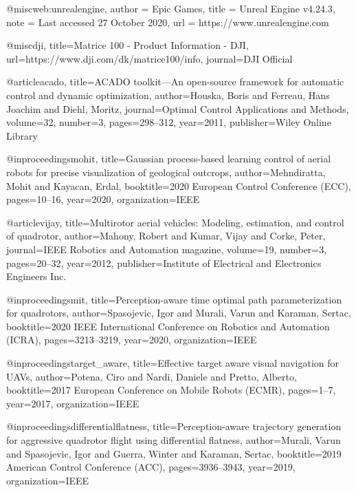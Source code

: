 \begin{thebibliography}{9}
@misc{web:unrealengine,
  author = {{Epic Games}},
  title = {{Unreal Engine v4.24.3}},
  note = {Last accessed 27 October 2020},
  url = {https://www.unrealengine.com}
}



@misc{dji, title={Matrice 100 - Product Information - DJI}, url={https://www.dji.com/dk/matrice100/info}, journal={DJI Official}} 


@article{acado,
  title={ACADO toolkit—An open-source framework for automatic control and dynamic optimization},
  author={Houska, Boris and Ferreau, Hans Joachim and Diehl, Moritz},
  journal={Optimal Control Applications and Methods},
  volume={32},
  number={3},
  pages={298--312},
  year={2011},
  publisher={Wiley Online Library}
}





@inproceedings{mohit,
  title={Gaussian process-based learning control of aerial robots for precise visualization of geological outcrops},
  author={Mehndiratta, Mohit and Kayacan, Erdal},
  booktitle={2020 European Control Conference (ECC)},
  pages={10--16},
  year={2020},
  organization={IEEE}
}




@article{vijay,
  title={Multirotor aerial vehicles: Modeling, estimation, and control of quadrotor},
  author={Mahony, Robert and Kumar, Vijay and Corke, Peter},
  journal={IEEE Robotics and Automation magazine},
  volume={19},
  number={3},
  pages={20--32},
  year={2012},
  publisher={Institute of Electrical and Electronics Engineers Inc.}
}


@inproceedings{mit,
  title={Perception-aware time optimal path parameterization for quadrotors},
  author={Spasojevic, Igor and Murali, Varun and Karaman, Sertac},
  booktitle={2020 IEEE International Conference on Robotics and Automation (ICRA)},
  pages={3213--3219},
  year={2020},
  organization={IEEE}
}

@inproceedings{target_aware,
  title={Effective target aware visual navigation for UAVs},
  author={Potena, Ciro and Nardi, Daniele and Pretto, Alberto},
  booktitle={2017 European Conference on Mobile Robots (ECMR)},
  pages={1--7},
  year={2017},
  organization={IEEE}
}


@inproceedings{differentialflatness,
  title={Perception-aware trajectory generation for aggressive quadrotor flight using differential flatness},
  author={Murali, Varun and Spasojevic, Igor and Guerra, Winter and Karaman, Sertac},
  booktitle={2019 American Control Conference (ACC)},
  pages={3936--3943},
  year={2019},
  organization={IEEE}
}



\end{thebibliography}
